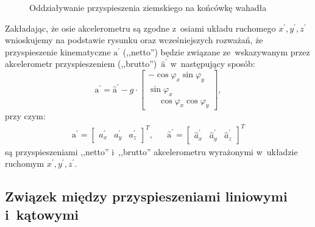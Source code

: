 \documentclass[paper=a4,DIV=12]{lpas}
\newcommand{\brm}[1]{\bm{\mathrm{#1}}}
\begin{document}
\begin{appendices}
\begin{figure}[htbp]
  \caption{Oddziaływanie przyspieszenia ziemskiego na końcówkę wahadła}
  \label{fig:AFKVE}
\end{figure}

Zakładając, że osie akcelerometru są zgodne z~osiami układu ruchomego
$x^{\prime},y^{\prime},z^{\prime}$ wnioskujemy na podstawie rysunku oraz
wcześniejszych rozważań, że przyspieszenie kinematyczne $\brm{a}^{\prime}$
(,,netto'') będzie związane ze~wskazywanym przez akcelerometr przyspieszeniem
(,,brutto'')~$\hat{\brm{a}}^{\prime}$ w~następujący sposób:
\begin{equation}
  {\brm{a}^{\prime}} = \hat{\brm{a}}^{\prime}
  -
  g \cdot
  \begin{bmatrix}
              -\cos{\varphi_x} \sin{\varphi_y}  \\
                      \sin{\varphi_x}          \\
    \phantom{-}\cos{\varphi_x} \cos{\varphi_y}
  \end{bmatrix},
  \label{eq:EUIQU}
\end{equation}
przy czym:
\begin{align}
  & \brm{a}^{\prime} = \begin{bmatrix}
    a_x^{\prime}  & a_y^{\prime}  & a_z^{\prime}
  \end{bmatrix}^T, &
  & \hat{\brm{a}}^{\prime}  = \begin{bmatrix}
    \hat{a}_x^{\prime}  & \hat{a}_y^{\prime}  & \hat{a}_z^{\prime}
  \end{bmatrix}^T &
  \label{eq:NL9I0}
\end{align}
są przyspieszeniami ,,netto'' i~,,brutto'' akcelerometru wyrażonymi w~układzie
ruchomym $x^{\prime},y^{\prime},z^{\prime}$.

\subsection{Związek między przyspieszeniami liniowymi i~kątowymi}
\label{sec:QTVP6}


\end{appendices}
\end{document}
